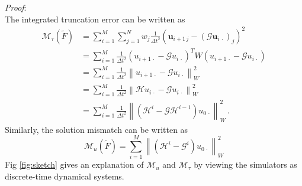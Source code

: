 \emph{Proof}: \\
The integrated truncation error can be written as
\begin{equation*}\begin{split}
    \mathcal{M}_{\tau}(\tilde{F}) &= 
        \sum_{i=1}^M \sum_{j=1}^N w_{j} \frac{1}{\Delta t^2}\left(
        \boldsymbol{u}_{i+1\, j} - (\mathcal{G}\boldsymbol{u}_{i\, \cdot})_j
        \right)^2\\
    &= \sum_{i=1}^M \frac{1}{\Delta t^2}(u_{i+1\,\cdot} - \mathcal{G} u_{i\,\cdot})^T W
                    (u_{i+1\,\cdot} - \mathcal{G} u_{i\,\cdot}) \\
    &= \sum_{i=1}^M \frac{1}{\Delta t^2}\left\|u_{i+1\,\cdot} - \mathcal{G} u_{i\,\cdot}\right\|^2_{W}\\
    &= \sum_{i=1}^M \frac{1}{\Delta t^2}\left\| \mathcal{H} u_{i\, \cdot} - \mathcal{G} u_{i\,\cdot} \right\|^2_{W}\\
    &= \sum_{i=1}^M \frac{1}{\Delta t^2} \left\| \left(\mathcal{H}^i - \mathcal{G} \mathcal{H}^{i-1}\right)
       u_{0\,\cdot} \right\|^2_{W}\,.
\end{split}\end{equation*}
Similarly, the solution mismatch can be written as
\begin{equation*}
    \mathcal{M}_u(\tilde{F}) = \sum_{i=1}^M \left\| 
    \left(\mathcal{H}^i - \mathcal{G}^i\right)
    u_{0\,\cdot} \right\|^2_{W}
\end{equation*}
Fig \ref{fig:sketch} gives an explanation of $\mathcal{M}_u$ and $\mathcal{M}_{\tau}$ by viewing 
the simulators as discrete-time dynamical systems.\\

